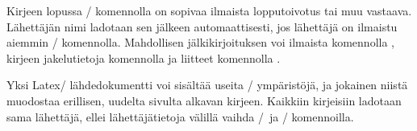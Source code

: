 Kirjeen lopussa \-/ komennolla on sopivaa ilmaista
lopputoivotus tai muu vastaava. Lähettäjän nimi ladotaan sen jälkeen
automaattisesti, jos lähettäjä on ilmaistu aiemmin
\-/ komennolla. Mahdollisen jälkikirjoituksen voi
ilmaista komennolla , kirjeen jakelutietoja komennolla
 ja liitteet komennolla .

Yksi Latex\-/ lähdedokumentti voi sisältää useita \-/
ympäristöjä, ja jokainen niistä muodostaa erillisen, uudelta sivulta
alkavan kirjeen. Kaikkiin kirjeisiin ladotaan sama lähettäjä, ellei
lähettäjätietoja välillä vaihda \-/\ ja
\-/ komennoilla.
